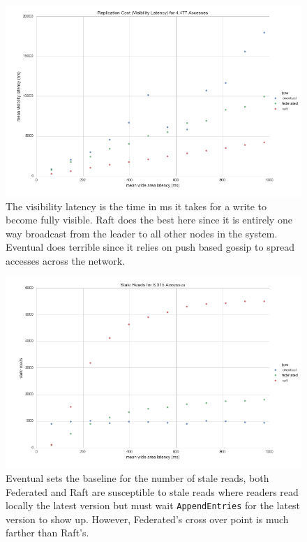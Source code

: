 \documentclass[11pt,letterpaper]{article}
\begin{document}
\begin{figure}[!h]
    \centering
        \includegraphics[width=\textwidth]{figures/visibility_latency.png}
        \caption{\textsf{The visibility latency is the time in ms it takes for a write to become fully visible. Raft does the best here since it is entirely one way broadcast from the leader to all other nodes in the system. Eventual does terrible since it relies on push based gossip to spread accesses across the network.}}
        \label{fig:visibility_latency}
\end{figure}

\begin{figure}[!h]
    \centering
        \includegraphics[width=\textwidth]{figures/stale_reads.png}
        \caption{\textsf{Eventual sets the baseline for the number of stale reads, both Federated and Raft are susceptible to stale reads where readers read locally the latest version but must wait \texttt{AppendEntries} for the latest version to show up. However, Federated's cross over point is much farther than Raft's. }}
        \label{fig:stale_reads}
\end{figure}
\end{document}
